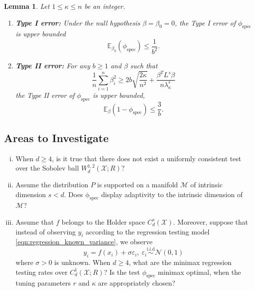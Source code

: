 \documentclass{article}
\newcommand{\1}{\mathbf{1}}
\newcommand{\spec}{\mathrm{spec}}
\theoremstyle{alden}
\theoremstyle{aldenthm}
\newtheorem{lemma}{Lemma}
\theoremstyle{definition}
\theoremstyle{remark}
\begin{document}
\begin{lemma}
	\label{lem:fixed_graph_testing}
	Let $1 \leq \kappa \leq n$ be an integer.
	\begin{enumerate}
		\item \textbf{Type I error:} Under the null hypothesis $\beta = \beta_0 = 0$, the Type I error of $\phi_{\spec}$ is upper bounded
		\begin{equation}
		\label{eqn:graph_spectral_type_I_error}
		\mathbb{E}_{\beta_0}(\phi_{\spec}) \leq \frac{1}{b^2}.
		\end{equation}
		\item \textbf{Type II error:} For any $b \geq 1$ and $\beta$ such that
		\begin{equation}
		\label{eqn:fixed_graph_testing_critical_radius}
		\frac{1}{n} \sum_{i = 1}^{n} \beta_i^2 \geq 2b\sqrt{\frac{2\kappa}{n^2}} + \frac{\beta^T L^s \beta}{n\lambda_{\kappa}^s}
		\end{equation}
		the Type II error of $\phi_{\spec}$ is upper bounded,
		\begin{equation}
		\label{eqn:graph_spectral_type_II_error}
		\mathbb{E}_{\beta}(1 - \phi_{\spec}) \leq \frac{3}{b}.
		\end{equation}
	\end{enumerate}
\end{lemma}

\subsection{Areas to Investigate}

\begin{enumerate}[(i)]
	\item When $d \geq 4$, is it true that there does not exist a uniformly consistent
	test over the Sobolev ball $W_d^{1,2}(\mathcal{X};R)$?
	\item Assume the distribution $P$ is supported on a manifold $\mathcal{M}$ of intrinsic dimension $s < d$. Does $\mathrm{\phi_{\mathrm{spec}}}$ display adaptivity to the intrinsic dimension of $\mathcal{M}$?
	\item Assume that $f$ belongs to the Holder space $C_d^s(\mathcal{X})$. Moreover, suppose that instead of observing ${y_i}$ according to the regression testing model \eqref{eqn:regression_known_variance}, we observe
	\begin{equation*}
	y_i = f(x_i) + \sigma \varepsilon_i, ~\varepsilon_i \overset{\textrm{i.i.d}}{\sim} \mathcal{N}(0,1)
	\end{equation*}
	where $\sigma > 0$ is unknown. When $d \geq 4$, what are the minimax regression testing rates over $C_d^1(\mathcal{X};R)$? Is the test $\phi_{\mathrm{spec}}$ minimax optimal, when the tuning parameters $r$ and $\kappa$ are appropriately chosen?
\end{enumerate}
\end{document}

